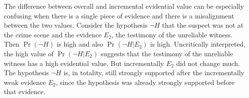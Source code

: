 \documentclass[10pt]{article}
\begin{document}
The difference between overall and incremental evidential value can be especially confusing when there is a single piece of evidence and there is a misalignment between the two values. Consider the hypothesis $\neg H$ that the suspect was not at the crime scene and the evidence $E_2$, the testimony of the unreliable witness. Then $\Pr(\neg H)$ is high and also $\Pr(\neg H | E_2)$ is high. Uncritically interpreted, the high value of $\Pr(\neg H | E_2)$ suggests that the testimony of the unreliable witness has a high evidential value. But incrementally $E_2$ did not change much. The hypothesis $\neg H$ is, in totality, still strongly supported after the incrementally weak evidence $E_2$, since the hypothesis was already strongly supported before that evidence. 

%
%
%
%
\end{document}
